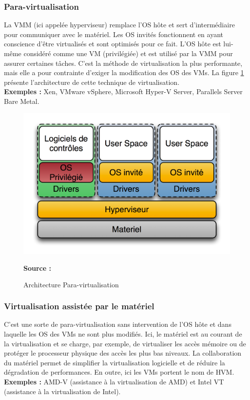     \subsubsection{Para-virtualisation}
    La VMM (ici appelée hyperviseur) remplace l'OS hôte et sert d'intermédiaire pour communiquer avec le matériel. Les OS invités fonctionnent en ayant conscience d'être virtualisés et sont optimisés pour ce fait. L'OS hôte est lui-même considéré comme une VM (privilégiée) et est utilisé par la VMM pour assurer certaines tâches. C'est la méthode de virtualisation la plus performante, mais elle a pour contrainte d'exiger la modification des OS des VMs. La figure \ref{fig:para_virtualisation} présente l'architecture de cette technique de virtualisation.
    \\ \textbf{Exemples :} Xen, VMware vSphere,  Microsoft Hyper-V Server, Parallels Server Bare Metal.
    \begin{figure}[htp]
      \centering
      \includegraphics[scale=.8]{fig1/para_virtualisation.png}
      \caption{Architecture Para-virtualisation}
      \label{fig:para_virtualisation}
      \centering \bfseries Source : \cite{online2}
    \end{figure}
    
    \subsubsection{Virtualisation assistée par le matériel}
    \label{subsubsection:hvm}
    C'est une sorte de para-virtualisation sans intervention de l'OS hôte et dans laquelle les OS des VMs ne sont plus modifiés. Ici, le matériel est au courant de la virtualisation et se charge, par exemple, de virtualiser les accès mémoire ou de protéger le processeur physique des accès les plus bas niveaux. La collaboration du matériel permet de simplifier la virtualisation logicielle et de réduire la dégradation de performances. En outre, ici les VMs portent le nom de \ac{HVM}.
    \\ \textbf{Exemples :} AMD-V (assistance à la virtualisation de AMD) et Intel VT (assistance à la virtualisation de Intel).

